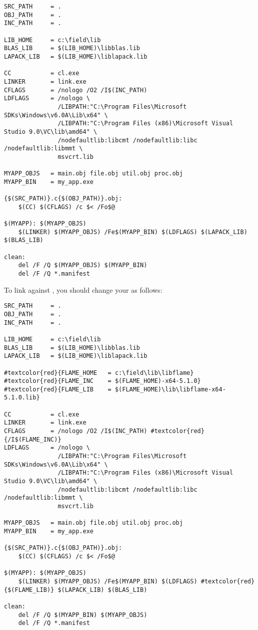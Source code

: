 \begin{Verbatim}[frame=single,framesep=2.5mm,xleftmargin=5mm,commandchars=\#\{\},fontsize=\footnotesize]
SRC_PATH     = .
OBJ_PATH     = .
INC_PATH     = .

LIB_HOME     = c:\field\lib
BLAS_LIB     = $(LIB_HOME)\libblas.lib
LAPACK_LIB   = $(LIB_HOME)\liblapack.lib

CC           = cl.exe
LINKER       = link.exe
CFLAGS       = /nologo /O2 /I$(INC_PATH)
LDFLAGS      = /nologo \
               /LIBPATH:"C:\Program Files\Microsoft SDKs\Windows\v6.0A\Lib\x64" \
               /LIBPATH:"C:\Program Files (x86)\Microsoft Visual Studio 9.0\VC\lib\amd64" \
               /nodefaultlib:libcmt /nodefaultlib:libc /nodefaultlib:libmmt \
               msvcrt.lib

MYAPP_OBJS   = main.obj file.obj util.obj proc.obj
MYAPP_BIN    = my_app.exe

{$(SRC_PATH)}.c{$(OBJ_PATH)}.obj:
    $(CC) $(CFLAGS) /c $< /Fo$@

$(MYAPP): $(MYAPP_OBJS)
	$(LINKER) $(MYAPP_OBJS) /Fe$(MYAPP_BIN) $(LDFLAGS) $(LAPACK_LIB) $(BLAS_LIB)

clean:
    del /F /Q $(MYAPP_OBJS) $(MYAPP_BIN)
    del /F /Q *.manifest
\end{Verbatim}

\noindent
To link against \libflame, you should change your \makefile as follows:

\begin{Verbatim}[frame=single,framesep=2.5mm,xleftmargin=5mm,commandchars=\#\{\},fontsize=\footnotesize]
SRC_PATH     = .
OBJ_PATH     = .
INC_PATH     = .

LIB_HOME     = c:\field\lib
BLAS_LIB     = $(LIB_HOME)\libblas.lib
LAPACK_LIB   = $(LIB_HOME)\liblapack.lib

#textcolor{red}{FLAME_HOME   = c:\field\lib\libflame}
#textcolor{red}{FLAME_INC    = $(FLAME_HOME)-x64-5.1.0}
#textcolor{red}{FLAME_LIB    = $(FLAME_HOME)\lib\libflame-x64-5.1.0.lib}

CC           = cl.exe
LINKER       = link.exe
CFLAGS       = /nologo /O2 /I$(INC_PATH) #textcolor{red}{/I$(FLAME_INC)}
LDFLAGS      = /nologo \
               /LIBPATH:"C:\Program Files\Microsoft SDKs\Windows\v6.0A\Lib\x64" \
               /LIBPATH:"C:\Program Files (x86)\Microsoft Visual Studio 9.0\VC\lib\amd64" \
               /nodefaultlib:libcmt /nodefaultlib:libc /nodefaultlib:libmmt \
               msvcrt.lib

MYAPP_OBJS   = main.obj file.obj util.obj proc.obj
MYAPP_BIN    = my_app.exe

{$(SRC_PATH)}.c{$(OBJ_PATH)}.obj:
    $(CC) $(CFLAGS) /c $< /Fo$@

$(MYAPP): $(MYAPP_OBJS)
	$(LINKER) $(MYAPP_OBJS) /Fe$(MYAPP_BIN) $(LDFLAGS) #textcolor{red}{$(FLAME_LIB)} $(LAPACK_LIB) $(BLAS_LIB)

clean:
    del /F /Q $(MYAPP_BIN) $(MYAPP_OBJS)
    del /F /Q *.manifest
\end{Verbatim}

